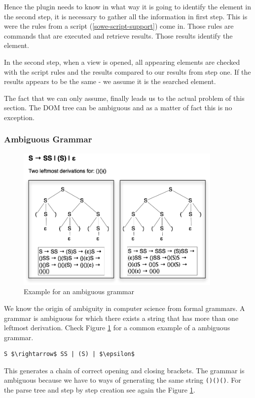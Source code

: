 Hence the plugin needs to know in what way it is going to identify the element in the second step, it is necessary to gather all the information in first step. This is were the rules from a script (\ref{sowe-script-support}) come in. Those rules are commands that are executed and retrieve results. Those results identify the element. 

In the second step, when a view is opened, all appearing elements are checked with the script rules and the results compared to our results from step one. If the results appears to be the same - we assume it is the searched element. 

The fact that we can only assume, finally leads us to the actual problem of this section. The DOM tree can be ambiguous and as a matter of fact this is no exception.

\subsubsection{Ambiguous Grammar}
\begin{figure}\centering
		\includegraphics[width=10cm]{images/ambiguous-grammar.png}
		\caption{Example for an ambiguous grammar}
		\label{ambiguous-grammar-pic}
\end{figure} 

We know the origin of ambiguity in computer science from formal grammars. A grammar is ambiguous for which there exists a string that has more than one leftmost derivation. Check Figure \ref{ambiguous-grammar-pic} for a common example of a ambiguous grammar.
\begin{lstlisting}[mathescape]
S $\rightarrow$ SS | (S) | $\epsilon$
\end{lstlisting}
This generates a chain of correct opening and closing brackets. The grammar is ambiguous because we have to ways of generating the same string \verb^()()()^. For the parse tree and step by step creation see again the Figure \ref{ambiguous-grammar-pic}.

